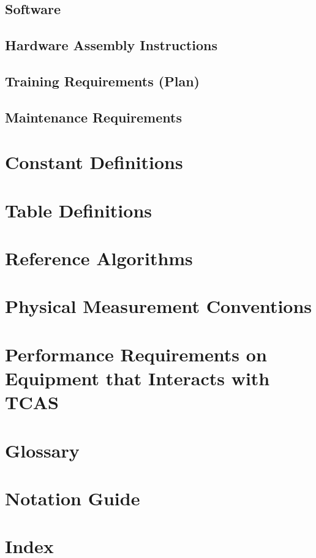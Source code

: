 \documentclass[12pt]{report}
\begin{document}
\section{Software}
\section{Hardware Assembly Instructions}
\section{Training Requirements (Plan)}
\section{Maintenance Requirements}

\appendix

\chapter{Constant Definitions}

\chapter{Table Definitions}

\chapter{Reference Algorithms}

\chapter{Physical Measurement Conventions}

\chapter{Performance Requirements on Equipment that Interacts with TCAS}

\chapter{Glossary}

\chapter{Notation Guide}

\chapter{Index}
\end{document}
